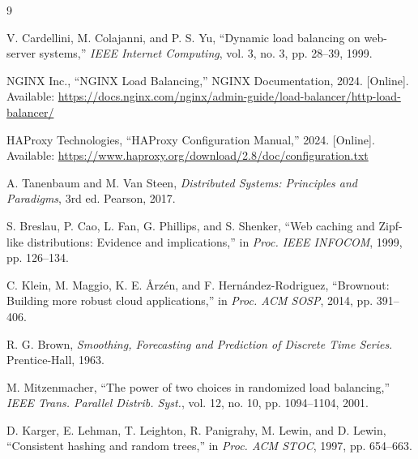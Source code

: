\documentclass[conference]{IEEEtran}
\begin{document}
\begin{thebibliography}{9}

V. Cardellini, M. Colajanni, and P. S. Yu, ``Dynamic load balancing on web-server systems,'' \textit{IEEE Internet Computing}, vol. 3, no. 3, pp. 28--39, 1999.

NGINX Inc., ``NGINX Load Balancing,'' NGINX Documentation, 2024. [Online]. Available: \url{https://docs.nginx.com/nginx/admin-guide/load-balancer/http-load-balancer/}

HAProxy Technologies, ``HAProxy Configuration Manual,'' 2024. [Online]. Available: \url{https://www.haproxy.org/download/2.8/doc/configuration.txt}

A. Tanenbaum and M. Van Steen, \textit{Distributed Systems: Principles and Paradigms}, 3rd ed. Pearson, 2017.

S. Breslau, P. Cao, L. Fan, G. Phillips, and S. Shenker, ``Web caching and Zipf-like distributions: Evidence and implications,'' in \textit{Proc. IEEE INFOCOM}, 1999, pp. 126--134.

C. Klein, M. Maggio, K. E. \AA{}rz\'en, and F. Hern\'andez-Rodriguez, ``Brownout: Building more robust cloud applications,'' in \textit{Proc. ACM SOSP}, 2014, pp. 391--406.

R. G. Brown, \textit{Smoothing, Forecasting and Prediction of Discrete Time Series}. Prentice-Hall, 1963.

M. Mitzenmacher, ``The power of two choices in randomized load balancing,'' \textit{IEEE Trans. Parallel Distrib. Syst.}, vol. 12, no. 10, pp. 1094--1104, 2001.

D. Karger, E. Lehman, T. Leighton, R. Panigrahy, M. Lewin, and D. Lewin, ``Consistent hashing and random trees,'' in \textit{Proc. ACM STOC}, 1997, pp. 654--663.

\end{thebibliography}
\end{document}
